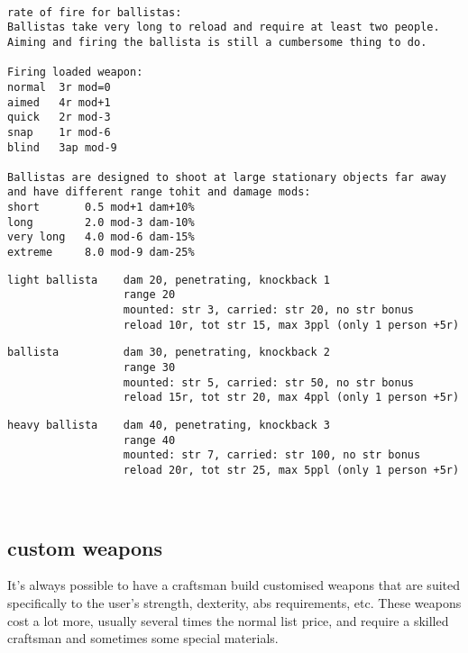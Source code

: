 \

\goodbreak \small \begin{samepage} \begin{verbatim}
rate of fire for ballistas:
Ballistas take very long to reload and require at least two people.
Aiming and firing the ballista is still a cumbersome thing to do.

Firing loaded weapon:
normal  3r mod=0
aimed   4r mod+1
quick   2r mod-3
snap    1r mod-6
blind   3ap mod-9

Ballistas are designed to shoot at large stationary objects far away
and have different range tohit and damage mods:
short       0.5 mod+1 dam+10%
long        2.0 mod-3 dam-10%
very long   4.0 mod-6 dam-15%
extreme     8.0 mod-9 dam-25%
\end{verbatim} \blocklistgap \begin{verbatim}
light ballista    dam 20, penetrating, knockback 1
                  range 20
                  mounted: str 3, carried: str 20, no str bonus
                  reload 10r, tot str 15, max 3ppl (only 1 person +5r)
\end{verbatim} \blocklistgap \begin{verbatim}
ballista          dam 30, penetrating, knockback 2
                  range 30
                  mounted: str 5, carried: str 50, no str bonus
                  reload 15r, tot str 20, max 4ppl (only 1 person +5r)
\end{verbatim} \blocklistgap \begin{verbatim}
heavy ballista    dam 40, penetrating, knockback 3
                  range 40
                  mounted: str 7, carried: str 100, no str bonus
                  reload 20r, tot str 25, max 5ppl (only 1 person +5r)
\end{verbatim} \end{samepage} \normalsize \goodbreak

\


\subsection*{custom weapons}
It's always possible to have a craftsman build customised weapons that are suited specifically to the user's strength, dexterity, abs requirements, etc. These weapons cost a lot more, usually several times the normal list price, and require a skilled craftsman and sometimes some special materials.

